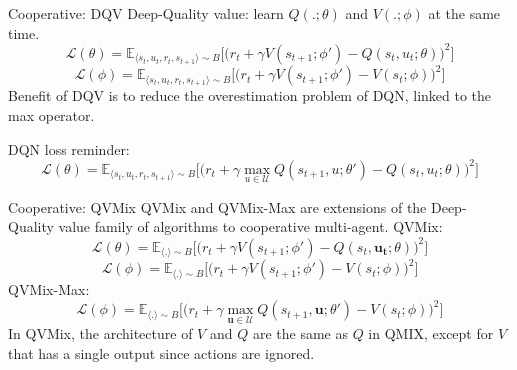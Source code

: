 \documentclass[9pt, hyperref={pdfusetitle,colorlinks=true,allcolors=DarkBlue}]{beamer}
\begin{document}
\begin{frame}{Cooperative: DQV}
Deep-Quality value: learn $Q(.;\theta)$ and $V(.;\phi)$ at the same time.
\begin{equation*}
    \mathcal{L}(\theta) = \mathds{E}_{\langle s_{t},u_{t},r_{t},s_{t+1}
    \rangle\sim B} \bigg[\big(r_{t} + \gamma V(s_{t+1}; \phi') - Q(s_{t}, u_{t}; \theta)\big)^{2}\bigg]
    \label{eq:dqv_q_update}
\end{equation*}
\begin{equation*}
    \mathcal{L}(\phi) = \mathds{E}_{\langle 
    s_{t},u_{t},r_{t},s_{t+1}
    \rangle\sim B} \bigg[\big(r_{t} + \gamma V(s_{t+1}; \phi') - V(s_{t}; \phi)\big)^{2}\bigg]
    \label{eq:dqv_v_update}
\end{equation*}
\vfill
Benefit of DQV is to reduce the overestimation problem of DQN, linked to the max operator.

DQN loss reminder:
\begin{equation*}
    \mathcal{L}(\theta) = \mathds{E}_{\langle s_{t},u_{t},r_{t},s_{t+1}\rangle \sim B} 
    \bigg[  
    \big(r_{t} + \gamma \max_{u \in \mathcal{U}} Q(s_{t+1}, u; \theta')
    - Q(s_{t}, u_{t}; \theta)\big)^{2}\bigg]
    \label{eq:DQN_loss_2}
\end{equation*}
\end{frame}

\begin{frame}{Cooperative: QVMix}
QVMix and QVMix-Max are extensions of the Deep-Quality value family of algorithms to cooperative multi-agent.
\vfill
QVMix:
\begin{equation}
    \mathcal{L}(\theta) = \mathds{E}_{\langle .
    \rangle\sim B} \bigg[\big(r_{t} + \gamma V(s_{t+1}; \phi') - Q(s_{t}, \bm{u_{t}}; \theta)\big)^{2}\bigg]
    \label{eq:dqv_qvmix_q_update}
\end{equation}
\begin{equation}
    \mathcal{L}(\phi) = \mathds{E}_{\langle 
    .
    \rangle\sim B} \bigg[\big(r_{t} + \gamma V(s_{t+1}; \phi') - V(s_{t}; \phi)\big)^{2}\bigg]
    \label{eq:dqv_qvmix_v_update}
\end{equation}
\vfill
QVMix-Max:
\vfill
\begin{equation}
    \mathcal{L}(\phi) = \mathds{E}_{\langle 
    .
    \rangle\sim B} \bigg[\big(r_{t} + \gamma \max_{\bm{u} \in \mathcal{U}} Q(s_{t+1}, \bm{u}; \theta') - V(s_{t}; \phi)\big)^{2}\bigg]
    \label{eq:dqv_qvmix_max_update}
\end{equation}
\vfill
In QVMix, the architecture of $V$ and $Q$ are the same as $Q$ in QMIX, except for $V$ that has a single output since actions are ignored.
\end{frame}
\end{document}
